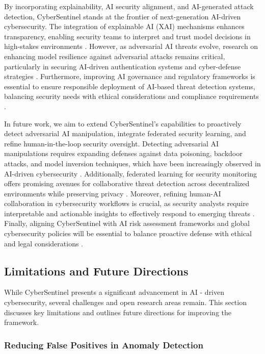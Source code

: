 \documentclass{article}
\begin{document}
By incorporating explainability, AI security alignment, and AI-generated attack detection, CyberSentinel stands at the frontier of next-generation AI-driven cybersecurity. The integration of explainable AI (XAI) mechanisms enhances transparency, enabling security teams to interpret and trust model decisions in high-stakes environments \cite{doshi2020considerations}. However, as adversarial AI threats evolve, research on enhancing model resilience against adversarial attacks remains critical, particularly in securing AI-driven authentication systems and cyber-defense strategies \cite{carlini2020evaluating}. Furthermore, improving AI governance and regulatory frameworks is essential to ensure responsible deployment of AI-based threat detection systems, balancing security needs with ethical considerations and compliance requirements \cite{weidinger2022taxonomy}.

In future work, we aim to extend CyberSentinel’s capabilities to proactively detect adversarial AI manipulation, integrate federated security learning, and refine human-in-the-loop security oversight. Detecting adversarial AI manipulations requires expanding defenses against data poisoning, backdoor attacks, and model inversion techniques, which have been increasingly observed in AI-driven cybersecurity \cite{goldblum2022dataset}. Additionally, federated learning for security monitoring offers promising avenues for collaborative threat detection across decentralized environments while preserving privacy \cite{kairouz2021advances}. Moreover, refining human-AI collaboration in cybersecurity workflows is crucial, as security analysts require interpretable and actionable insights to effectively respond to emerging threats \cite{bhatt2021machine}. Finally, aligning CyberSentinel with AI risk assessment frameworks and global cybersecurity policies will be essential to balance proactive defense with ethical and legal considerations \cite{brundage2020toward}.

\subsection{Limitations and Future Directions}
While CyberSentinel presents a significant advancement in AI - driven cybersecurity, several challenges and open research areas remain. This section discusses key limitations and outlines future directions for improving the framework.

\subsubsection{Reducing False Positives in Anomaly Detection}
\end{document}
